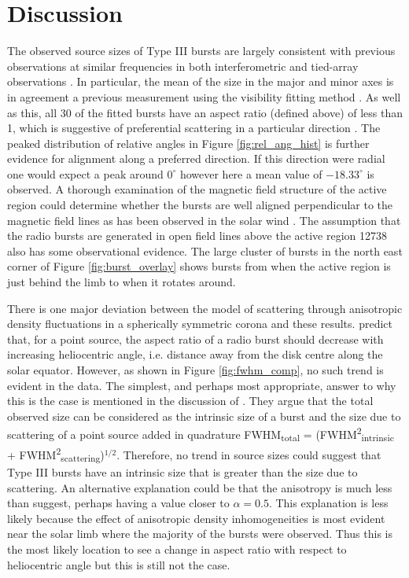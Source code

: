 \section{Discussion}
\label{sec:obsvtheory_discussion}
The observed source sizes of Type III bursts are largely consistent with previous observations at similar frequencies in both interferometric and tied-array observations \citep{Kontar2017, Zhang2020}. In particular, the mean of the size in the major and minor axes is in agreement a previous measurement using the visibility fitting method \citep{Murphy2021}. As well as this, all 30 of the fitted bursts have an aspect ratio (defined above) of less than 1, which is suggestive of preferential scattering in a particular direction \citep{Anantharamaiah1994, Bastian1994}. The peaked distribution of relative angles in Figure \ref{fig:rel_ang_hist} is further evidence for alignment along a preferred direction. If this direction were radial one would expect a peak around $0^\circ$ however here a mean value of $-18.33^\circ$ is observed. A thorough examination of the magnetic field structure of the active region could determine whether the bursts are well aligned perpendicular to the magnetic field lines as has been observed in the solar wind \citep{Anantharamaiah1994, SasikumarRaja2016}. The assumption that the radio bursts are generated in open field lines above the active region 12738 also has some observational evidence. The large cluster of bursts in the north east corner of Figure \ref{fig:burst_overlay} shows bursts from when the active region is just behind the limb to when it rotates around.

There is one major deviation between the model of scattering through anisotropic density fluctuations in a spherically symmetric corona and these results. \cite{Kontar2019} predict that, for a point source, the aspect ratio of a radio burst should decrease with increasing heliocentric angle, i.e. distance away from the disk centre along the solar equator. However, as shown in Figure \ref{fig:fwhm_comp}, no such trend is evident in the data.  The simplest, and perhaps most appropriate, answer to why this is the case is mentioned in the discussion of \cite{Kontar2019}. They argue that the total observed size can be considered as the intrinsic size of a burst and the size due to scattering of a point source added in quadrature FWHM\textsubscript{total} = (FWHM\textsuperscript{2}\textsubscript{intrinsic} + FWHM\textsuperscript{2}\textsubscript{scattering})$^{1/2}$. Therefore, no trend in source sizes could suggest that Type III bursts have an intrinsic size that is greater than the size due to scattering. An alternative explanation could be that the anisotropy is much less than \cite{Kontar2019} suggest, perhaps having a value closer to $\alpha = 0.5$. This explanation is less likely because the effect of anisotropic density inhomogeneities is most evident near the solar limb where the majority of the bursts were observed. Thus this is the most likely location to see a change in aspect ratio with respect to heliocentric angle but this is still not the case.


